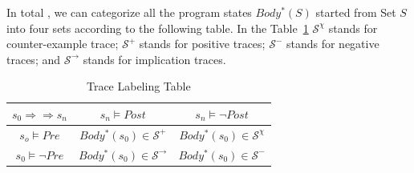 In total , we can categorize all the program states $Body^*(S)$ started from Set $S$ into four sets according to the following table.
In the Table~\ref{tab:labeling}
$\mathcal{S}^\chi$ stands for counter-example trace;
$\mathcal{S}^+$ stands for positive traces;
$\mathcal{S}^-$ stands for negative traces; 
and $\mathcal{S}^\rightarrow$ stands for implication traces.

\begin{table}[htb]
\label{tab:labeling}
\centering
\begin{tabular}[float]{|c|c|c|}
\hline
$s_0 \Rightarrow \Rightarrow s_n$ & $s_n \models Post$            & $s_n \models \neg Post$\\
\hline
$s_o \models Pre$                 & $Body^*(s_0) \in \mathcal{S}^+$       & $Body^*(s_0) \in \mathcal{S}^\chi$\\
\hline
$s_0 \models \neg Pre$            & $Body^*(s_0) \in \mathcal{S}^\rightarrow$       & $Body^*(s_0) \in \mathcal{S}^-$\\
\hline
\end{tabular}
\caption{Trace Labeling Table}
\end{table}

